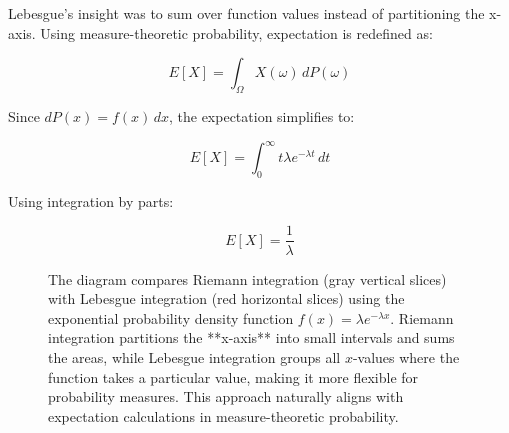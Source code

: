 Lebesgue’s insight was to sum over function values instead of partitioning the x-axis. Using measure-theoretic probability, expectation is redefined as:

\[
E[X] = \int_{\Omega} X(\omega) \, dP(\omega)
\]

Since \( dP(x) = f(x) \, dx \), the expectation simplifies to:

\[
E[X] = \int_0^\infty t \lambda e^{-\lambda t} \, dt
\]

Using integration by parts:

\[
E[X] = \frac{1}{\lambda}
\]

\begin{figure}[h]
    \centering

    \caption{The diagram compares Riemann integration (gray vertical slices) with Lebesgue integration (red horizontal slices) using the exponential probability density function \( f(x) = \lambda e^{-\lambda x} \). Riemann integration partitions the **x-axis** into small intervals and sums the areas, while Lebesgue integration groups all \( x \)-values where the function takes a particular value, making it more flexible for probability measures. This approach naturally aligns with expectation calculations in measure-theoretic probability.}
\end{figure}

